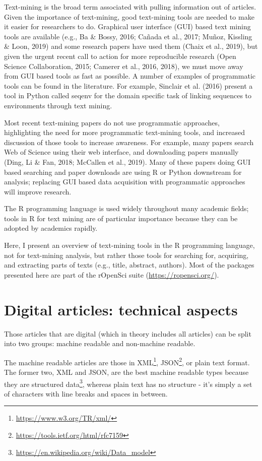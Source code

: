 \documentclass[author-year, review, 11pt]{components/elsarticle} %
\begin{document}
Text-mining is the broad term associated with pulling information out of
articles. Given the importance of text-mining, good text-mining tools
are needed to make it easier for researchers to do. Graphical user
interface (GUI) based text mining tools are available (e.g., Ba \&
Bossy, 2016; Cañada et al., 2017; Muñoz, Kissling \& Loon, 2019) and
some research papers have used them (Chaix et al., 2019), but given the
urgent recent call to action for more reproducible research (Open
Science Collaboration, 2015; Camerer et al., 2016, 2018), we must move
away from GUI based tools as fast as possible. A number of examples of
programmatic tools can be found in the literature. For example, Sinclair
et al. (2016) present a tool in Python called seqenv for the domain
specific task of linking sequences to environments through text mining.

Most recent text-mining papers do not use programmatic approaches,
highlighting the need for more programmatic text-mining tools, and
increased discussion of those tools to increase awareness. For example,
many papers search Web of Science using their web interface, and
downloading papers manually (Ding, Li \& Fan, 2018; McCallen et al.,
2019). Many of these papers doing GUI based searching and paper
downloads are using R or Python downstream for analysis; replacing GUI
based data acquisition with programmatic approaches will improve
research.

The R programming language is used widely throughout many academic
fields; tools in R for text mining are of particular importance because
they can be adopted by academics rapidly.

Here, I present an overview of text-mining tools in the R programming
language, not for text-mining analysis, but rather those tools for
searching for, acquiring, and extracting parts of texts (e.g., title,
abstract, authors). Most of the packages presented here are part of the
rOpenSci suite (\url{https://ropensci.org/}).

\hypertarget{digital-articles-technical-aspects}{%
\section{Digital articles: technical
aspects}\label{digital-articles-technical-aspects}}

Those articles that are digital (which in theory includes all articles)
can be split into two groups: machine readable and non-machine readable.

The machine readable articles are those in XML\footnote{\url{https://www.w3.org/TR/xml/}},
JSON\footnote{\url{https://tools.ietf.org/html/rfc7159}}, or plain text
format. The former two, XML and JSON, are the best machine readable
types because they are structured data\footnote{\url{https://en.wikipedia.org/wiki/Data_model}},
whereas plain text has no structure - it's simply a set of characters
with line breaks and spaces in between.
\end{document}
